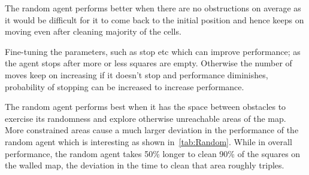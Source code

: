 \documentclass[12pt]{article}
\begin{document}
The random agent performs better when there are no obstructions on
average as it would be difficult for it to come back to the initial
position and hence keeps on moving even after cleaning majority of the
cells.

Fine-tuning the parameters, such as stop etc which can improve
performance; as the agent stops after more or less squares are empty. 
Otherwise the number of moves keep on increasing if it doesn’t stop and
performance diminishes, probability of stopping can be increased to
increase performance.

The random agent performs best when it has the space between obstacles to exercise its randomness and explore otherwise unreachable areas of the map.
More constrained areas cause a much larger deviation in the performance of the random agent which is interesting as shown in~\ref{tab:Random}.  
While in overall performance, the random agent takes 50\% longer to clean 90\% of the squares on the walled map, the deviation in the time to clean that area roughly triples.  
\end{document}
